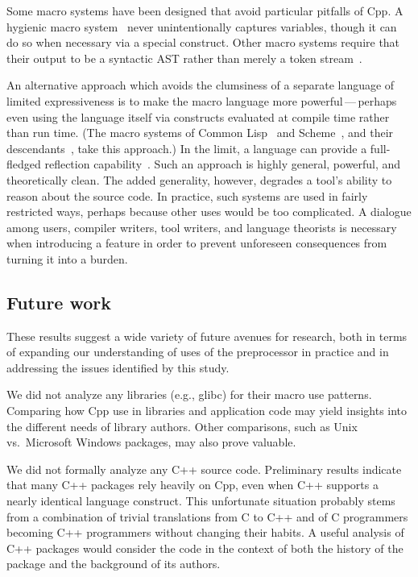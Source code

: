 \documentclass[10pt]{article}
\newcommand{\pkg}[1]{\textsf{#1}}
\begin{document}
Some macro systems have been designed that avoid particular pitfalls of Cpp.
A hygienic macro system~\cite{lfp86*151} never unintentionally captures
variables, though it can do so when necessary via a special construct.
Other macro systems require that their output to be a syntactic AST rather
than merely a token stream~\cite{WeiseC93}.

An alternative approach which avoids the clumsiness of a separate language
of limited expressiveness is to make the macro language more
powerful\,---\,perhaps even using the language itself via constructs
evaluated at compile time rather than run time.  (The macro systems of
Common Lisp~\cite{commonlisp:languagespec} and
Scheme~\cite{Clinger91:R4RS}, and their descendants~\cite{WeiseC93}, take
this approach.)  In the limit, a language can provide a full-fledged
reflection capability~\cite{kicz91}.  Such an approach is highly general,
powerful, and theoretically clean.  The added generality, however, degrades
a tool's ability to reason about the source code.  In practice, such
systems are used in fairly restricted ways, perhaps because other uses
would be too complicated.  A dialogue among users, compiler writers, tool
writers, and language theorists is necessary when introducing a feature in
order to prevent unforeseen consequences from turning it into a burden.


\subsection{Future work}
 
These results suggest a wide variety of future avenues for research, both
in terms of expanding our understanding of uses of the preprocessor in
practice and in addressing the issues identified by this study.

We did not analyze any libraries (e.g., \pkg{glibc}) for their macro use
patterns.  Comparing how Cpp use in libraries and application code may
yield insights into the different needs of library authors.  Other
comparisons, such as Unix vs.~Microsoft Windows packages, may also prove
valuable.

We did not formally analyze any C++ source code.  Preliminary results
indicate that many C++ packages rely heavily on Cpp, even when C++ supports
a nearly identical language construct.  This unfortunate situation probably
stems from a combination of trivial translations from C to C++ and of C
programmers becoming C++ programmers without changing their habits.  A
useful analysis of C++ packages would consider the code in the context of
both the history of the package and the background of its authors.
\end{document}
